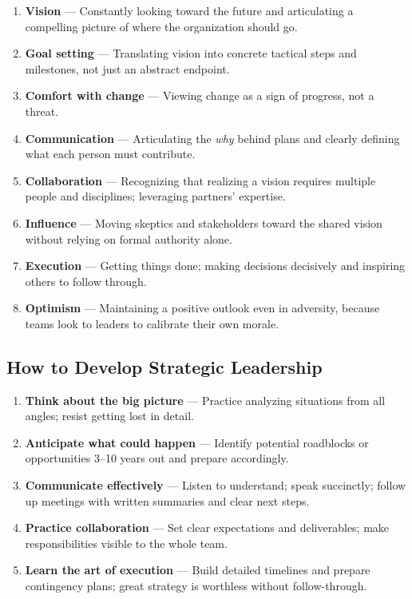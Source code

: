 \documentclass[11pt, letterpaper]{article}
\begin{document}
\begin{enumerate}[leftmargin=*, label=\textbf{\arabic*.}]
  \item \textbf{Vision} --- Constantly looking toward the future and articulating a compelling picture of where the organization should go.
  \item \textbf{Goal setting} --- Translating vision into concrete tactical steps and milestones, not just an abstract endpoint.
  \item \textbf{Comfort with change} --- Viewing change as a sign of progress, not a threat.
  \item \textbf{Communication} --- Articulating the \textit{why} behind plans and clearly defining what each person must contribute.
  \item \textbf{Collaboration} --- Recognizing that realizing a vision requires multiple people and disciplines; leveraging partners' expertise.
  \item \textbf{Influence} --- Moving skeptics and stakeholders toward the shared vision without relying on formal authority alone.
  \item \textbf{Execution} --- Getting things done; making decisions decisively and inspiring others to follow through.
  \item \textbf{Optimism} --- Maintaining a positive outlook even in adversity, because teams look to leaders to calibrate their own morale.
\end{enumerate}

\subsection{How to Develop Strategic Leadership}

\begin{enumerate}[leftmargin=*, label=\textbf{\arabic*.}]
  \item \textbf{Think about the big picture} --- Practice analyzing situations from all angles; resist getting lost in detail.
  \item \textbf{Anticipate what could happen} --- Identify potential roadblocks or opportunities 3--10 years out and prepare accordingly.
  \item \textbf{Communicate effectively} --- Listen to understand; speak succinctly; follow up meetings with written summaries and clear next steps.
  \item \textbf{Practice collaboration} --- Set clear expectations and deliverables; make responsibilities visible to the whole team.
  \item \textbf{Learn the art of execution} --- Build detailed timelines and prepare contingency plans; great strategy is worthless without follow-through.
\end{enumerate}
\end{document}
